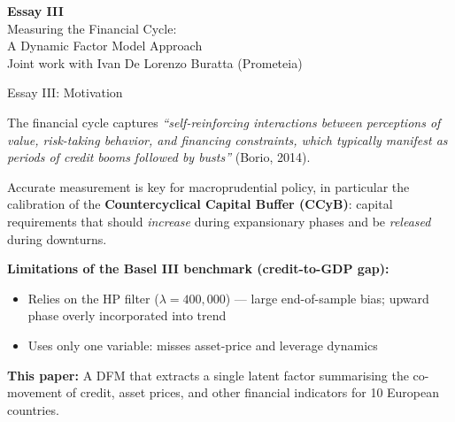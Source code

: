 \documentclass{beamer}
\begin{document}
\begin{frame}{}
  \begin{center}
    \Large\textcolor{isegblue}{\textbf{Essay III}} \\[0.8em]
    \large Measuring the Financial Cycle:\\
    A Dynamic Factor Model Approach
    \\[0.4em]
    {\small Joint work with Ivan De Lorenzo Buratta (Prometeia)}
  \end{center}
\end{frame}

\begin{frame}{Essay III: Motivation}

The financial cycle captures \textit{``self-reinforcing interactions between perceptions of value, risk-taking behavior, and financing constraints, which typically manifest as periods of credit booms followed by busts''} (Borio, 2014).

\vspace{0.5em}
Accurate measurement is key for macroprudential policy, in particular the calibration of the \textbf{Countercyclical Capital Buffer (CCyB)}: capital requirements that should \emph{increase} during expansionary phases and be \emph{released} during downturns.

\vspace{0.5em}
\textbf{Limitations of the Basel III benchmark (credit-to-GDP gap):}
\begin{itemize}
  \item Relies on the HP filter ($\lambda=400{,}000$) --- large end-of-sample bias; upward phase overly incorporated into trend
  \item Uses only one variable: misses asset-price and leverage dynamics
\end{itemize}

\vspace{0.4em}
\textbf{This paper:} A DFM that extracts a single latent factor summarising the co-movement of credit, asset prices, and other financial indicators for 10 European countries.

\end{frame}
\end{document}
